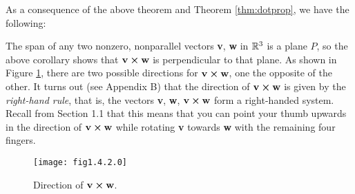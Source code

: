 As a consequence of the above theorem and Theorem \ref{thm:dotprop}, we have the following:


The span of any two nonzero, nonparallel vectors \textbf{v}, \textbf{w} in $\mathbb{R}^{3}$ is a plane $P$, so the above
corollary shows that $\textbf{v} \bm{\times} \textbf{w}$ is perpendicular to that plane. As shown in
Figure \ref{fig:crossnormal}, there are two possible directions for $\textbf{v} \bm{\times} \textbf{w}$, one the
opposite of the other.
It turns out (see Appendix B) that the direction of $\textbf{v} \bm{\times} \textbf{w}$
is given by the \emph{right-hand rule}, that is, the vectors \textbf{v}, \textbf{w},
$\textbf{v} \bm{\times} \textbf{w}$ form a right-handed system. Recall from Section 1.1 that this means that
you can point your thumb upwards in the direction of $\textbf{v} \bm{\times} \textbf{w}$
while rotating \textbf{v} towards \textbf{w} with the remaining four fingers.

\begin{figure}[h]
 \begin{center}
  \texttt{[image: fig1.4.2.0]}
 \end{center}
 \caption[]{\quad Direction of $\textbf{v} \bm{\times} \textbf{w}$.}
 \label{fig:crossnormal}
\end{figure}

